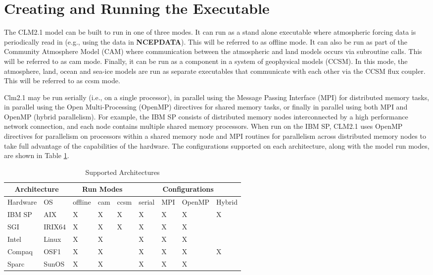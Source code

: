 \section{Creating and Running the Executable}

The CLM2.1 model can be built to run in one of three modes. It can run
as a stand alone executable where atmospheric forcing data is
periodically read in (e.g., using the data in {\bf NCEPDATA}).  This
will be referred to as offline mode. It can also be run as part of the
Community Atmosphere Model (CAM) where communication between the
atmospheric and land models occurs via subroutine calls. This will be
referred to as cam mode. Finally, it can be run as a component in a
system of geophysical models (CCSM).  In this mode, the atmosphere,
land, ocean and sea-ice models are run as separate executables
that communicate with each other via the CCSM flux coupler. This will
be referred to as ccsm mode.

Clm2.1 may be run serially (i.e., on a single processor), in
parallel using the Message Passing Interface (MPI) for distributed
memory tasks, in parallel using the Open Multi-Processing (OpenMP)
directives for shared memory tasks, or finally in parallel using both
MPI and OpenMP (hybrid parallelism).  For example, the IBM SP consists
of distributed memory nodes interconnected by a high performance
network connection, and each node contains multiple shared memory
processors.  When run on the IBM SP, CLM2.1 uses OpenMP directives for
parallelism on processors within a shared memory node and MPI routines
for parallelism across distributed memory nodes to take full advantage
of the capabilities of the hardware.  The configurations supported on
each architecture, along with the model run modes, are shown in Table
\ref{table_supported_arch}.

\begin{longtable}{|l|l||l|l|l||l|l|l|l|}
\caption{\label{table_supported_arch} Supported Architectures} \\ \hline 
\multicolumn{2}{|c||}{\bf Architecture} &  
\multicolumn{3}{|c||}{\bf Run Modes}    &
\multicolumn{4}{|c|}{\bf Configurations} \\ \hline 
Hardware & OS     & offline & cam & ccsm & serial & MPI & OpenMP & Hybrid \\ \hline 
IBM SP   & AIX    &    X    &  X  &   X  &   X    &  X  &  X     &   X    \\ \hline 
SGI      & IRIX64 &    X    &  X  &   X  &   X    &  X  &  X     &        \\ \hline  
Intel    & Linux  &    X    &  X  &      &   X    &  X  &  X     &        \\ \hline  
Compaq   & OSF1   &    X    &  X  &      &   X    &  X  &  X     &   X    \\ \hline 
Sparc    & SunOS  &    X    &  X  &      &   X    &  X  &  X     &         \\ \hline        
\end{longtable}
\medskip

